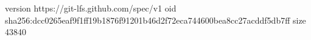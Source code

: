 version https://git-lfs.github.com/spec/v1
oid sha256:dcc0265eaf9f1ff19b1876f91201b46d2f72eca744600bea8cc27acddf5db7ff
size 43840
